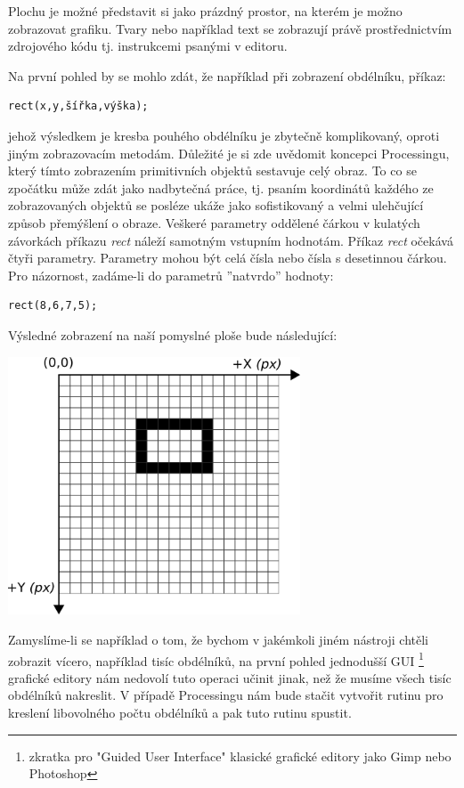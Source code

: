 \documentclass[10pt]{book}
\begin{document}
Plochu je možné představit si jako prázdný prostor, na kterém je možno zobrazovat grafiku. Tvary nebo například text se zobrazují právě prostřednictvím zdrojového kódu tj. instrukcemi psanými v editoru.

Na první pohled by se mohlo zdát, že například při zobrazení obdélníku, příkaz:

\begin{lstlisting}
rect(x,y,šířka,výška);
\end{lstlisting}

jehož výsledkem je kresba pouhého obdélníku je zbytečně komplikovaný, oproti jiným zobrazovacím metodám. Důležité je si zde uvědomit koncepci Processingu, který tímto zobrazením primitivních objektů sestavuje celý obraz. To co se zpočátku může zdát jako nadbytečná práce, tj. psaním koordinátů každého ze zobrazovaných objektů se posléze ukáže jako sofistikovaný a velmi ulehčující způsob přemýšlení o obraze. Veškeré parametry oddělené čárkou v kulatých závorkách příkazu {\em rect} náleží samotným vstupním hodnotám. Příkaz {\em rect} očekává čtyři parametry. Parametry mohou být celá čísla nebo čísla s desetinnou čárkou. Pro názornost, zadáme-li do parametrů ''natvrdo'' hodnoty:

\begin{lstlisting}
rect(8,6,7,5);
\end{lstlisting}

Výsledné zobrazení na naší pomyslné ploše bude následující:

\begin{center}
\includegraphics[width = 0.65\textwidth]{imgs/gridRect2d.png}
\end{center}


Zamyslíme-li se například o tom, že bychom v jakémkoli jiném nástroji chtěli zobrazit vícero, například tisíc obdélníků, na první pohled jednodušší GUI \footnote{zkratka pro "Guided User Interface" klasické grafické editory jako Gimp nebo Photoshop} grafické editory nám nedovolí tuto operaci učinit jinak, než že musíme všech tisíc obdélníků nakreslit. V případě Processingu nám bude stačit vytvořit rutinu pro kreslení libovolného počtu obdélníků a pak tuto rutinu spustit.
\end{document}
